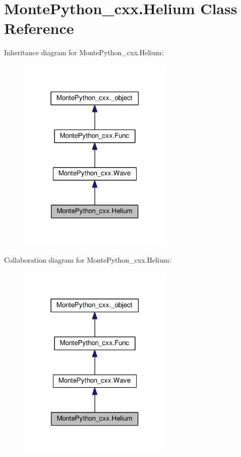 \hypertarget{classMontePython__cxx_1_1Helium}{}\section{Monte\+Python\+\_\+cxx.\+Helium Class Reference}
\label{classMontePython__cxx_1_1Helium}


Inheritance diagram for Monte\+Python\+\_\+cxx.\+Helium\+:
\nopagebreak
\begin{figure}[H]
\begin{center}
\leavevmode
\includegraphics[width=210pt]{classMontePython__cxx_1_1Helium__inherit__graph}
\end{center}
\end{figure}


Collaboration diagram for Monte\+Python\+\_\+cxx.\+Helium\+:
\nopagebreak
\begin{figure}[H]
\begin{center}
\leavevmode
\includegraphics[width=210pt]{classMontePython__cxx_1_1Helium__coll__graph}
\end{center}
\end{figure}
